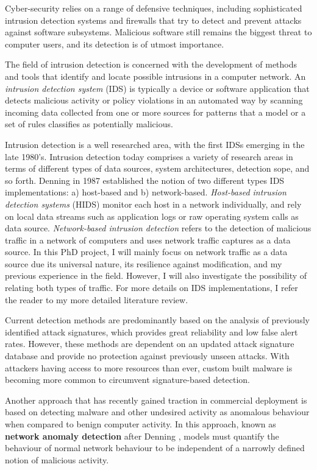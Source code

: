 \documentclass[a4paper,12pt,twoside]{article}
\begin{document}
Cyber-security relies on a range of defensive techniques, including sophisticated intrusion detection systems and firewalls that try to detect and prevent attacks against software subsystems. Malicious software still remains the biggest threat to computer users, and its detection is of utmost importance. 

The field of intrusion detection is concerned with the development of methods and tools that identify and locate possible intrusions in a computer network. An \textit{intrusion detection system} (IDS) is typically a device or software application that detects malicious activity or policy violations in an automated way by scanning incoming data collected from one or more sources for patterns that a model or a set of rules classifies as potentially malicious.

Intrusion detection is a well researched area, with the first IDSs emerging in the late 1980's. Intrusion detection today comprises a variety of research areas in terms of different types of data sources, system architectures, detection sope, and so forth. Denning \cite{denning1987intrusion} in 1987 established the notion of two different types IDS implementations: a) host-based and b) network-based. 
\textit{Host-based intrusion detection systems} (HIDS) monitor each host in a network individually, and rely on local data streams such as application logs or raw operating system calls as  data source. \textit{Network-based intrusion detection} refers to the detection of malicious traffic in a network of computers and uses network traffic captures as a data source. In this PhD project, I will mainly focus on network traffic as a data source due its universal nature, its resilience against modification, and my previous experience in the field. However, I will also investigate the possibility of relating both types of traffic. For more details on IDS implementations, I refer the reader to my more detailed literature review. 


Current detection methods are predominantly based on the analysis of previously identified attack signatures, which provides great reliability and low false alert rates. However, these methods are dependent on an updated attack signature database and provide no protection against previously unseen attacks. With attackers having access to more resources than ever, custom built malware is becoming more common to circumvent signature-based detection. 

Another approach that has recently gained traction in commercial deployment is based on detecting malware and other undesired activity as anomalous behaviour when compared to benign computer activity. In this approach, known as \textbf{network anomaly detection} after Denning \cite{denning1987intrusion}, models must quantify the behaviour of normal network behaviour to be independent of a narrowly defined notion of malicious activity.
\end{document}
